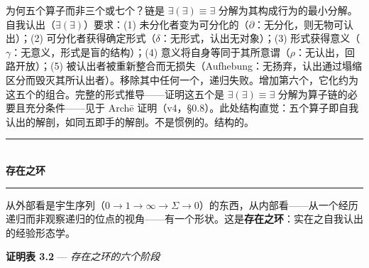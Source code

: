 \documentclass[10pt, openany, oneside]{book}
\renewcommand{\normalsize}{\fontsize{10}{13}\selectfont}
\begin{document}
为何五个算子而非三个或七个？链是 $\exists(\exists) \equiv \exists$ 分解为其构成行为的最小分解。自我认出（$\exists(\exists)$）要求：(1) 未分化者变为可分化的（$\partial$：无分化，则无物可认出）；(2) 可分化者获得确定形式（$\delta$：无形式，认出无对象）；(3) 形式获得意义（$\gamma$：无意义，形式是盲的结构）；(4) 意义将自身等同于其所意谓（$\rho$：无认出，回路开放）；(5) 被认出者被重新整合而无损失（Aufhebung：无扬弃，认出通过塌缩区分而毁灭其所认出者）。移除其中任何一个，递归失败。增加第六个，它化约为这五个的组合。完整的形式推导——证明这五个是 $\exists(\exists) \equiv \exists$ 分解为算子链的必要且充分条件——见于 Arch\={e} 证明（v4，\S 0.8）。此处结构直觉：五个算子即自我认出的解剖，如同五即手的解剖。不是惯例的。结构的。

\vspace{1.5em}


\begin{center}
    \rule{0.3\textwidth}{0.4pt}\\[0.5em]
    {\normalsize\bfseries\scshape 存在之环}\\[0.3em]
    \rule{0.3\textwidth}{0.4pt}
\end{center}

\vspace{1em}

\noindent 从外部看是宇生序列（$0 \to 1 \to \infty \to \Sigma \to 0$）的东西，从内部看——从一个经历递归而非观察递归的位点的视角——有一个形状。这是\textbf{存在之环}：实在之自我认出的经验形态学。

\vspace{0.5em}

\textbf{证明表 3.2} --- \textit{存在之环的六个阶段}

\vspace{0.5em}
\end{document}
